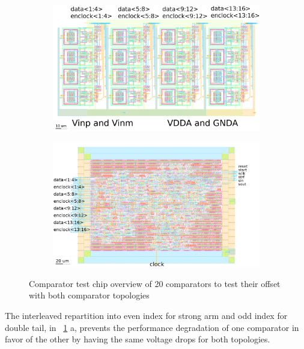 \begin{figure}[htp]
    \centering
    \begin{subfigure}[b]{0.48\textwidth}
        \includegraphics[width=\textwidth]{Chapter5/Figs/comp_test/comparator_analog_offset_layout.png}
    \end{subfigure}
    \begin{subfigure}[b]{0.48\textwidth}
        \includegraphics[width=\textwidth]{Chapter5/Figs/comp_test/comparator_digital_offset_layout.png}
    \end{subfigure}
    \caption{Comparator test chip overview of 20 comparators to test their offset with both comparator topologies}
    \label{fig:comp_offset_layout}
\end{figure}

The interleaved repartition into even index for strong arm and odd index for double tail, in \figurename~\ref{fig:comp_offset_layout} a, prevents the performance degradation of one comparator in favor of the other by having the same voltage drops for both topologies.

